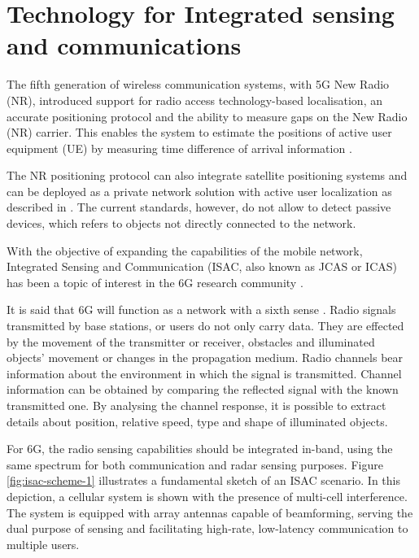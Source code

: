 \chapter{Technology for Integrated sensing and communications}

The fifth generation of wireless communication systems, with 5G New Radio (NR), introduced support for radio access technology-based localisation, an accurate positioning protocol and the ability to measure gaps on the New Radio (NR) carrier. 
This enables the system to estimate the positions of active user equipment (UE) by measuring time difference of arrival information \cite{Keating_Saily_Hulkkonen_Karjalainen_2019}.

The NR positioning protocol can also integrate satellite positioning systems and can be deployed as a private network solution with active user localization as described in  \cite{Henninger_Abrudan_Mandelli_Arnold_Saur_Kolmonen_Klein_Schlitter_Brink_2022}.
The current standards, however, do not allow to detect passive devices, which refers to objects not directly connected to the network.

With the objective of expanding the capabilities of the mobile network, Integrated Sensing and Communication (ISAC, also known as JCAS or ICAS) has been a topic of interest in the 6G research community \cite{Mandelli_Henninger_Bauhofer_Wild_2023}.

It is said that 6G will function as a network with a sixth sense \cite{Viswanathan_Wild_2021}. Radio signals transmitted by base stations, or users do not only carry data. They are effected by the movement of the transmitter or receiver, obstacles and illuminated objects' movement or changes in the propagation medium. Radio channels bear information about the environment in which the signal is transmitted. 
Channel information can be obtained by comparing the reflected signal with the known transmitted one. By analysing the channel response, it is possible to extract details about position, relative speed, type and shape of illuminated objects.

For 6G, the radio sensing capabilities should be integrated in-band, using the same spectrum for both communication and radar sensing purposes. Figure \ref{fig:isac-scheme-1} illustrates a fundamental sketch of an ISAC scenario. In this depiction, a cellular system is shown with the presence of multi-cell interference. The system is equipped with array antennas capable of beamforming, serving the dual purpose of sensing and facilitating high-rate, low-latency communication to multiple users.

